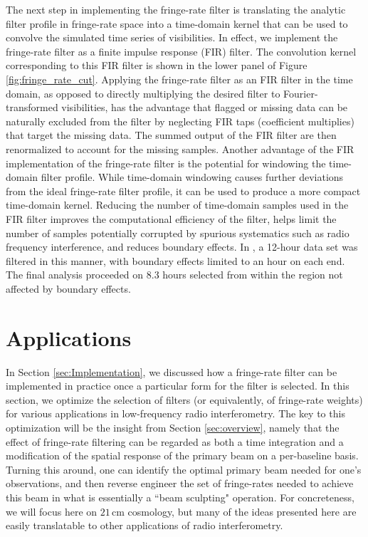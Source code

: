 \documentclass[twocolumn,apj,numberedappendix]{emulateapj}
\begin{document}
The next step in implementing the fringe-rate filter is translating the analytic filter profile in fringe-rate space into 
a time-domain kernel that can be used to convolve the simulated time series of visibilities.  In effect, we implement
the fringe-rate filter as a finite impulse response (FIR) filter.  The convolution kernel corresponding to this FIR
filter is shown in the lower panel of Figure \ref{fig:fringe_rate_cut}.  Applying the fringe-rate filter as an FIR filter in
the time domain, as opposed to directly multiplying the desired filter to Fourier-transformed visibilities, has the advantage 
that flagged or missing data can be naturally excluded from the filter by neglecting
FIR taps (coefficient multiplies) that target the missing data. The summed output of the FIR filter are then renormalized to
account for the missing samples.  Another advantage of the FIR implementation of the fringe-rate filter is the potential for
windowing the time-domain filter profile.  While time-domain windowing causes further deviations from the ideal
fringe-rate filter profile, it can be used to produce a more compact time-domain kernel.
Reducing the number of time-domain samples used in the FIR filter improves the computational efficiency of the filter, 
helps limit the number of samples potentially corrupted by spurious systematics such as radio frequency interference,
and reduces boundary effects.  In \citet{ali_et_al2015}, a 12-hour data set was filtered in this manner, with boundary
effects limited to an hour on each end.  The final analysis proceeded on 8.3 hours selected from within the region
not affected by boundary effects.


\section{Applications}
\label{sec:bmsculpt}

In Section \ref{sec:Implementation}, we discussed how a fringe-rate filter can be implemented in practice once a particular form for the filter is selected. In this section, we optimize the selection of filters (or equivalently, of fringe-rate weights) for various applications in low-frequency radio interferometry. The key to this optimization will be the insight from Section \ref{sec:overview}, namely that the effect of fringe-rate filtering can be regarded as both a time integration and a modification of the spatial response of the primary beam on a per-baseline basis. Turning this around, one can identify the optimal primary beam needed for one's observations, and then reverse engineer the set of fringe-rates needed to achieve this beam in what is essentially a ``beam sculpting" operation. For concreteness, we will focus here on $21\,\textrm{cm}$ cosmology, but many of the ideas presented here are easily translatable to other applications of radio interferometry.
\end{document}
